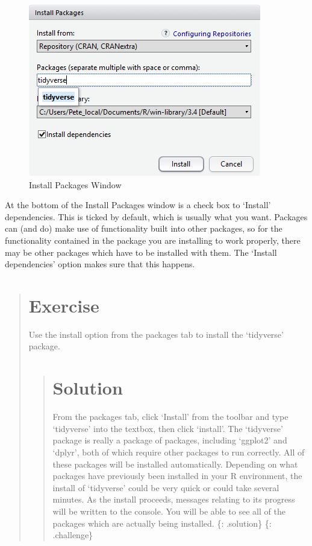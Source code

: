 \documentclass[]{book}
\begin{document}
\begin{figure}
\centering
\includegraphics{./fig/R_00_Rstudio_03.png}
\caption{Install Packages Window}
\end{figure}

At the bottom of the Install Packages window is a check box to `Install'
dependencies. This is ticked by default, which is usually what you want.
Packages can (and do) make use of functionality built into other
packages, so for the functionality contained in the package you are
installing to work properly, there may be other packages which have to
be installed with them. The `Install dependencies' option makes sure
that this happens.

\begin{quote}
\section{Exercise}\label{exercise}

Use the install option from the packages tab to install the `tidyverse'
package.

\begin{quote}
\section{Solution}\label{solution}

From the packages tab, click `Install' from the toolbar and type
`tidyverse' into the textbox, then click `install'. The `tidyverse'
package is really a package of packages, including `ggplot2' and
`dplyr', both of which require other packages to run correctly. All of
these packages will be installed automatically. Depending on what
packages have previously been installed in your R environment, the
install of `tidyverse' could be very quick or could take several
minutes. As the install proceeds, messages relating to its progress will
be written to the console. You will be able to see all of the packages
which are actually being installed. \{: .solution\} \{: .challenge\}
\end{quote}
\end{quote}
\end{document}
